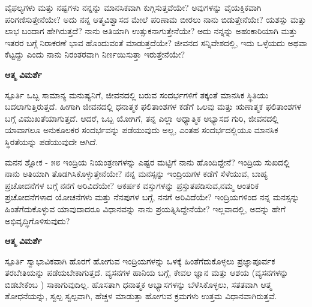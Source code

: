 \newpage
\begin{mananam}{}
\small \mananatext ವೈಫಲ್ಯಗಳು ಮತ್ತು ನಷ್ಟಗಳು ನನ್ನನ್ನು ಮಾನಸಿಕವಾಗಿ  ಕುಗ್ಗಿಸುತ್ತವೆಯೇ? ಅವುಗಳನ್ನು ವೈಯಕ್ತಿಕವಾಗಿ ಪರಿಗಣಿಸುತ್ತೇನೆಯೇ? ಅದು ನನ್ನ ಆತ್ಮವಿಶ್ವಾಸದ ಮೇಲೆ ಪರಿಣಾಮ ಬೀರಲು ನಾನು ಬಿಡುತ್ತೇನೆಯೇ? ಯಶಸ್ಸು ಮತ್ತು ಲಾಭ ಬಂದಾಗ ಹೇಗಿರುತ್ತದೆ? ನಾನು ಅತಿಯಾಗಿ  ಉತ್ಸುಕನಾಗುತ್ತೇನೆಯೇ? ಅದು ನನ್ನನ್ನು ಅಹಂಕಾರಿಯಾಗಿ ಮತ್ತು ಇತರರ ಬಗ್ಗೆ ನಿರಾಕರಣೆ ಭಾವ ಹೊಂದುವಂತೆ ಮಾಡುತ್ತದೆಯೇ? ಜೀವನದ ಸನ್ನಿವೇಶದಲ್ಲಿ, ಇದು ಒಳ್ಳೆಯದು ಅಥವಾ ಕೆಟ್ಟದ್ದು ಎಂದು ನಾನು ನಿರಂತರವಾಗಿ ನಿರ್ಣಯಿಸುತ್ತಾ ಇರುತ್ತೇನೆಯೇ?
\end{mananam}
\WritingHand\enspace\textbf{ಆತ್ಮ ವಿಮರ್ಶೆ}
\begin{inspiration}{\mananamfont ಸ್ಪೂರ್ತಿ}
\small \mananatext ಒಬ್ಬ ಸಾಮಾನ್ಯ ಮನುಷ್ಯನಿಗೆ, ಜೀವನದಲ್ಲಿ ಬರುವ ಸಂದರ್ಭಗಳಿಗೆ ತಕ್ಕಂತೆ ಮಾನಸಿಕ ಸ್ಥಿತಿಯು ಬದಲಾಗುತ್ತಿರುತ್ತದೆ. ಹೀಗಾಗಿ ಜೀವನದಲ್ಲಿ ಧನಾತ್ಮಕ ಫಲಿತಾಂಶಗಳ ಕಡೆಗೆ ಒಲವು ಮತ್ತು ಋಣಾತ್ಮಕ ಫಲಿತಾಂಶಗಳ ಬಗ್ಗೆ ವಿಮುಖತೆಯಾಗುತ್ತದೆ. ಆದರೆ,  ಒಬ್ಬ ಯೋಗಿಗೆ, ತನ್ನ ಎಲ್ಲಾ ಅಧ್ಯಾತ್ಮಿಕ ಅಭ್ಯಾಸದ ಗುರಿ, ಜೀವನದಲ್ಲಿ ಯಾವಾಗಲೂ ಅನುಕೂಲಕರ ಸಂದರ್ಭವನ್ನು ಪಡೆಯುವುದು ಅಲ್ಲ, ಎಂತಹ ಸಂದರ್ಭದಲ್ಲಿಯೂ ಮಾನಸಿಕ ಸ್ಥಿರತೆಯನ್ನು ಪಡೆಯುವುದೇ ಆಗಿದೆ.
\end{inspiration}
\newpage

\begin{mananam}{\mananamfont ಮನನ ಶ್ಲೋಕ - ೫೮}
\small \mananatext ಇಂದ್ರಿಯ ನಿಯಂತ್ರಣಗಳನ್ನು ಎಷ್ಟರ ಮಟ್ಟಿಗೆ ನಾನು ಹೊಂದಿದ್ದೇನೆ? ಇಂದ್ರಿಯ ಸುಖದಲ್ಲಿ ನಾನು ಅತಿಯಾಗಿ ತೊಡಗಿಸಿಕೊಳ್ಳುತ್ತೇನೆಯೇ? ನನ್ನ ಮನಸ್ಸನ್ನು ಇಂದ್ರಿಯಗಳ ಕಡೆಗೆ ಸೆಳೆಯುವ, ಬಾಹ್ಯ ಪ್ರಚೋದನೆಗಳ ಬಗ್ಗೆ ನನಗೆ ಅರಿವಿದೆಯೇ? ಆಕರ್ಷಕ ವಸ್ತುಗಳನ್ನು ಪ್ರಸ್ತುತಪಡಿಸುವ,ನಮ್ಮ ಆಂತರಿಕ ಪ್ರಚೋದನೆಗಳಾದ ಯೋಚನೆಗಳು ಮತ್ತು ನೆನಪುಗಳ ಬಗ್ಗೆ, ನನಗೆ ಅರಿವಿದೆಯೇ? ಇಂದ್ರಿಯಗಳಿಂದ ನನ್ನ ಮನಸ್ಸನ್ನು ಹಿಂತೆಗೆದುಕೊಳ್ಳುವ ಯಾವುದಾದರೂ ವಿಧಾನವನ್ನು ನಾನು ಪ್ರಯತ್ನಿಸಿದ್ದೇನೆಯೇ? ಇಲ್ಲವಾದಲ್ಲಿ, ಅದನ್ನು ಹೇಗೆ ಅಭಿವೃದ್ಧಿಗೊಳಿಸುವುದು?
\end{mananam}
\WritingHand\enspace\textbf{ಆತ್ಮ ವಿಮರ್ಶೆ}
\begin{inspiration}{\mananamfont ಸ್ಪೂರ್ತಿ}
\small \mananatext ಸ್ವಾಭಾವಿಕವಾಗಿ ಹೊರಗೆ ಹೋಗುವ ಇಂದ್ರಿಯಗಳನ್ನು ಒಳಕ್ಕೆ ಹಿಂತೆಗೆದುಕೊಳ್ಳಲು ಪ್ರಜ್ಞಾಪೂರ್ವಕ ತರಬೇತಿಯನ್ನು ಪಡೆಯಬೇಕಾಗುತ್ತದೆ. ವ್ಯಸನಗಳ ಹಾನಿಯ ಬಗ್ಗೆ, ಕೇವಲ ಜ್ಞಾನ ಮತ್ತು ಆಶಯ (ವ್ಯಸನಗಳನ್ನು ಬಿಡಬೇಕೆಂಬ ) ಸಾಕಾಗುವುದಿಲ್ಲ. ಹೊಸತಾಗಿ ಧನಾತ್ಮಕ ಅಭ್ಯಾಸಗಳನ್ನು ಬೆಳೆಸಿಕೊಳ್ಳಲು, ಸತತವಾಗಿ ಆತ್ಮ ಶೋಧನೆಯನ್ನು, ಸ್ವಲ್ಪ ಸ್ವಲ್ಪವಾಗಿ, ಹೆಚ್ಚಳ ಮಾಡುತ್ತಾ ಹೋಗುವ ಕ್ರಮಗಳು ಉತ್ತಮ ವಿಧಾನವಾಗಿರುತ್ತವೆ.
\end{inspiration}
\newpage

